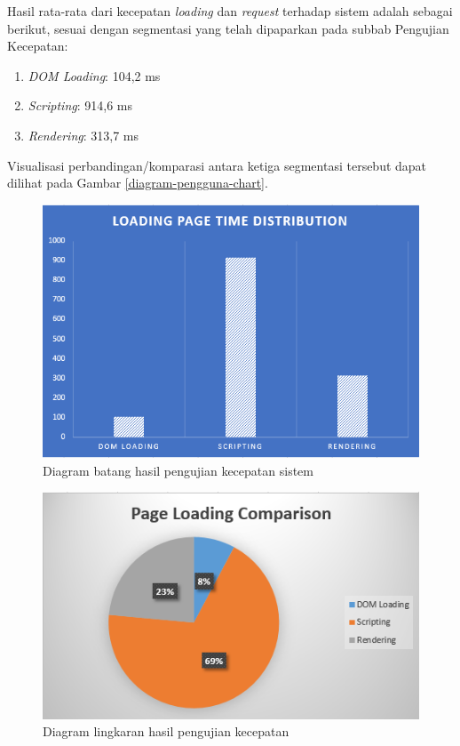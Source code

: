 Hasil rata-rata dari kecepatan \textit{loading} dan \textit{request} terhadap sistem adalah sebagai berikut, sesuai dengan segmentasi yang telah dipaparkan pada subbab Pengujian Kecepatan:
\begin{enumerate}
	\item \textit{DOM Loading}: 104,2 ms
	\item \textit{Scripting}: 914,6 ms
	\item \textit{Rendering}: 313,7 ms
\end{enumerate}

Visualisasi perbandingan/komparasi antara ketiga segmentasi tersebut dapat dilihat pada Gambar \ref{diagram-pengguna-chart}.

\begin{figure}[H]
	\centering
	\includegraphics[width=\textwidth]{images/bab5/speed/bar-chart.png}
	\caption{Diagram batang hasil pengujian kecepatan sistem }
	\label{chart-speed-test}
\end{figure}

\begin{figure}[H]
	\centering
	\includegraphics[width=\textwidth]{images/bab5/speed/circle-chart.png}
	\caption{Diagram lingkaran hasil pengujian kecepatan}
	\label{circle-chart-speed-test}
\end{figure}

